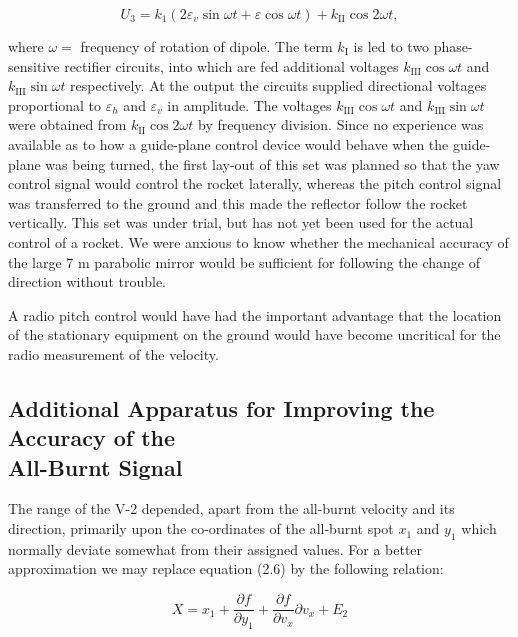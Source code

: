 \documentclass[12pt, a4paper]{article}
\begin{document}
\begin{equation}
  U_{3}=k_{1}(2\varepsilon_{v}\sin{\omega t}+\varepsilon\cos{\omega t})+k_{\text{II}}\cos{2\omega t},
\end{equation}

where $\omega=$ frequency of rotation of dipole. The term $k_{\text{I}}$ is led to two phase- sensitive rectifier circuits, into which are fed additional voltages $k_{\text{III}}\cos{\omega t}$ and  $k_{\text{III}}\sin{\omega t}$ respectively. At the output the circuits supplied directional voltages proportional to $\varepsilon_{h}$ and $\varepsilon_{v}$ in amplitude. The voltages $k_{\text{III}}\cos{\omega t}$ and $k_{\text{III}}\sin{\omega t}$ were obtained from $k_{\text{II}}\cos{2\omega t}$  by frequency division. Since no experience was available as to how a guide-plane control device would behave when the guide-plane was being turned, the first lay-out of this set was planned so that the yaw control signal would control the rocket laterally, whereas the pitch control signal was transferred to the ground and this made the reflector follow the rocket vertically. This set was under trial, but has not yet been used for the actual control of a rocket. We were anxious to know whether the mechanical accuracy of the large 7 m parabolic mirror would be sufficient for following the change of direction without trouble.

A radio pitch control would have had the important advantage that the location of the stationary equipment on the ground would have become uncritical for the radio measurement of the velocity.

\subsection[Additional Apparatus for Improving the Accuracy of the All-Burnt Signal]{Additional Apparatus for Improving the Accuracy of the\\All-Burnt Signal}

The range of the V-2 depended, apart from the all-burnt velocity and its direction, primarily upon the co-ordinates of the all-burnt spot $x_{1}$ and $y_{1}$ which normally deviate somewhat from their assigned values. For a better approximation we may replace equation (2.6) by the following relation:

\begin{equation}
  X=x_{1}+\frac{\partial f}{\partial y_{1}}+\frac{\partial f}{\partial v_{x}}\partial v_{x}+E_{2}
\end{equation}
\end{document}
